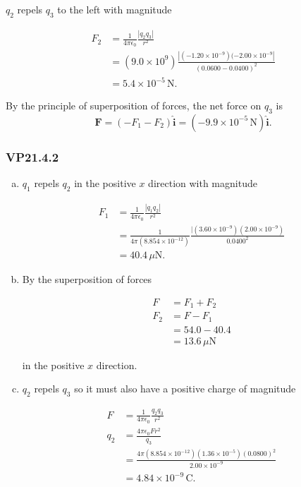 \documentclass{article}
\begin{document}
$q_2$ repels $q_3$ to the left with magnitude

\begin{align*}
  F_2 & = \frac{1}{4\pi\epsilon_0} \frac{|q_2 q_3|}{r^2}                                              \\
      & = (9.0 \times 10^9) \frac{|(-1.20 \times 10^{-9})(-2.00 \times 10^{-9}|}{(0.0600 - 0.0400)^2} \\
      & = 5.4 \times 10^{-5} \,\textrm{N}.
\end{align*}

By the principle of superposition of forces, the net force on $q_3$ is \[\mathbf{F} = (-F_1 - F_2)\hat{\mathbf{i}} = (-9.9 \times 10^{-5} \,\textrm{N}) \hat{\mathbf{i}}.\]

\subsubsection{VP21.4.2}

\begin{enumerate}[a)]
  \item $q_1$ repels $q_2$ in the positive $x$ direction with magnitude

        \begin{align*}
          F_1 & = \frac{1}{4\pi\epsilon_0} \frac{|q_1 q_2|}{r^2}                                                       \\
              & = \frac{1}{4 \pi (8.854 \times 10^{-12})} \frac{|(3.60 \times 10^{-9})(2.00 \times 10^{-9})}{0.0400^2} \\
              & = 40.4 \,\mu\textrm{N}.
        \end{align*}

  \item By the superposition of forces

        \begin{align*}
          F   & = F_1 + F_2            \\
          F_2 & = F - F_1              \\
              & = 54.0 - 40.4          \\
              & = 13.6 \,\mu\textrm{N}
        \end{align*}

        in the positive $x$ direction.

  \item $q_2$ repels $q_3$ so it must also have a positive charge of magnitude

        \begin{align*}
          F   & = \frac{1}{4\pi\epsilon_0} \frac{q_2 q_3}{r^2}                                           \\
          q_2 & = \frac{4\pi\epsilon_0 F r^2}{q_3}                                                       \\
              & = \frac{4\pi(8.854 \times 10^{-12})(1.36 \times 10^{-5})(0.0800)^2}{2.00 \times 10^{-9}} \\
              & = 4.84 \times 10^{-9} \,\textrm{C}.
        \end{align*}
\end{enumerate}
\end{document}
